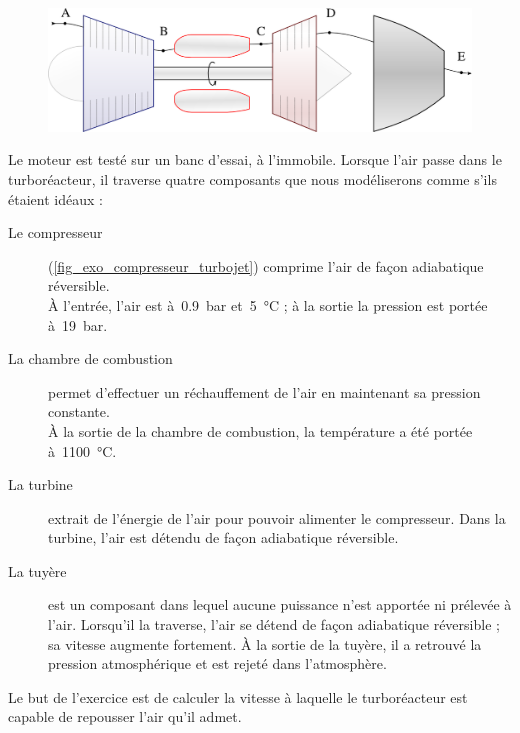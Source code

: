 	\begin{figure}
		\begin{center}
			\includegraphics[width=\textwidth]{images/turbojet.png}
		\end{center}
		\label{fig_exo_turbojet}
	\end{figure}
	
	Le moteur est testé sur un banc d’essai, à l’immobile. Lorsque l’air passe dans le turboréacteur, il traverse quatre composants que nous modéliserons comme s’ils étaient idéaux :
	
	\begin{description}
		\item [Le compresseur] (\cref{fig_exo_compresseur_turbojet}) comprime l’air de façon adiabatique réversible.\\
			À l’entrée, l’air est à~\SI{0,9}{\bar} et~\SI{5}{\degreeCelsius} ; à la sortie la pression est portée à~\SI{19}{\bar}.
		\item [La chambre de combustion] permet d’effectuer un réchauffement de l’air en maintenant sa pression constante.\\
			À la sortie de la chambre de combustion, la température a été portée à~\SI{1100}{\degreeCelsius}.
		\item [La turbine] extrait de l’énergie de l’air pour pouvoir alimenter le compresseur. Dans la turbine, l’air est détendu de façon adiabatique réversible.
		\item [La tuyère] est un composant dans lequel aucune puissance n’est apportée ni prélevée à l’air. Lorsqu’il la traverse, l’air se détend de façon adiabatique réversible ; sa vitesse augmente fortement. À la sortie de la tuyère, il a retrouvé la pression atmosphérique et est rejeté dans l’atmosphère.
	\end{description}
	
	Le but de l’exercice est de calculer la vitesse à laquelle le turboréacteur est capable de repousser l’air qu’il admet.
	
	\pagebreak[1] %
	
